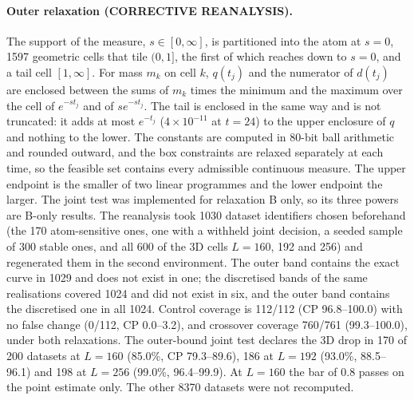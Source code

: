\documentclass[aps,pre,twocolumn,superscriptaddress,nofootinbib,10pt]{revtex4-2}
\begin{document}
\paragraph*{Outer relaxation (CORRECTIVE REANALYSIS).}
The support of the measure, $s\in[0,\infty]$, is partitioned into the atom at $s=0$, 1597 geometric cells that tile $(0,1]$, the first of which reaches down to $s=0$, and a tail cell $[1,\infty]$. For mass $m_k$ on cell $k$, $q(t_j)$ and the numerator of $d(t_j)$ are enclosed between the sums of $m_k$ times the minimum and the maximum over the cell of $e^{-st_j}$ and of $se^{-st_j}$. The tail is enclosed in the same way and is not truncated: it adds at most $e^{-t_j}$ ($4\times10^{-11}$ at $t=24$) to the upper enclosure of $q$ and nothing to the lower. The constants are computed in 80-bit ball arithmetic and rounded outward, and the box constraints are relaxed separately at each time, so the feasible set contains every admissible continuous measure. The upper endpoint is the smaller of two linear programmes and the lower endpoint the larger. The joint test was implemented for relaxation B only, so its three powers are B-only results. The reanalysis took 1030 dataset identifiers chosen beforehand (the 170 atom-sensitive ones, one with a withheld joint decision, a seeded sample of 300 stable ones, and all 600 of the 3D cells $L=160$, 192 and 256) and regenerated them in the second environment. The outer band contains the exact curve in 1029 and does not exist in one; the discretised bands of the same realisations covered 1024 and did not exist in six, and the outer band contains the discretised one in all 1024. Control coverage is 112/112 (CP 96.8--100.0) with no false change (0/112, CP 0.0--3.2), and crossover coverage 760/761 (99.3--100.0), under both relaxations. The outer-bound joint test declares the 3D drop in 170 of 200 datasets at $L=160$ (85.0\%, CP 79.3--89.6), 186 at $L=192$ (93.0\%, 88.5--96.1) and 198 at $L=256$ (99.0\%, 96.4--99.9). At $L=160$ the bar of 0.8 passes on the point estimate only. The other 8370 datasets were not recomputed.
\end{document}
